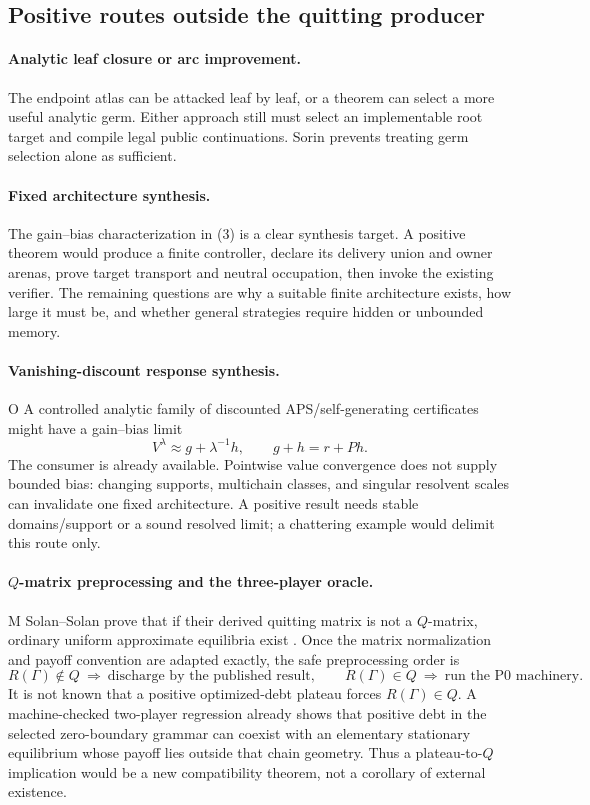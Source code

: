 \documentclass[11pt]{article}
\newcommand{\MTag}{\textsf{M}}
\newcommand{\OTag}{\textsf{O}}
\newcommand{\Audit}{\MTag}
\newcommand{\Open}{\OTag}
\newcommand{\Status}[1]{#1}
\begin{document}
\subsection{Positive routes outside the quitting producer}

\paragraph{Analytic leaf closure or arc improvement.}
The endpoint atlas can be attacked leaf by leaf, or a theorem can select a
more useful analytic germ.  Either approach still must select an implementable
root target and compile legal public continuations.  Sorin prevents treating
germ selection alone as sufficient.

\paragraph{Fixed architecture synthesis.}
The gain--bias characterization in (3) is a clear synthesis target.  A
positive theorem would produce a finite controller, declare its delivery union
and owner arenas, prove target transport and neutral occupation, then invoke
the existing verifier.  The remaining questions are why a suitable finite
architecture exists, how large it must be, and whether general strategies
require hidden or unbounded memory.

\paragraph{Vanishing-discount response synthesis.}
\Status{\Open} A controlled analytic family of discounted
APS/self-generating certificates might have a gain--bias limit
\[
 V^\lambda\approx g+\lambda^{-1}h,\qquad g+h=r+Ph.
\tag{24}
\]
The consumer is already available.  Pointwise value convergence does not
supply bounded bias: changing supports, multichain classes, and singular
resolvent scales can invalidate one fixed architecture.  A positive result
needs stable domains/support or a sound resolved limit; a chattering example
would delimit this route only.

\paragraph{$Q$-matrix preprocessing and the three-player oracle.}
\Status{\Audit} Solan--Solan prove that if their derived quitting matrix is not
a $Q$-matrix, ordinary uniform approximate equilibria exist
\cite{SolanSolan2020}.  Once the matrix normalization and payoff convention are
adapted exactly, the safe preprocessing order is
\[
 R(\Gamma)\notin Q\ \Longrightarrow\ \text{discharge by the published result},
 \qquad
 R(\Gamma)\in Q\ \Longrightarrow\ \text{run the P0 machinery}.
\tag{25}
\]
It is not known that a positive optimized-debt plateau forces
$R(\Gamma)\in Q$.  A machine-checked two-player regression already shows that
positive debt in the selected zero-boundary grammar can coexist with an
elementary stationary equilibrium whose payoff lies outside that chain
geometry.  Thus a plateau-to-$Q$ implication would be a new compatibility
theorem, not a corollary of external existence.
\end{document}
